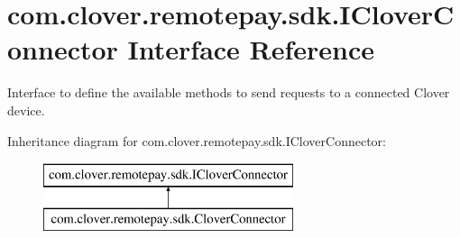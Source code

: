 \hypertarget{interfacecom_1_1clover_1_1remotepay_1_1sdk_1_1_i_clover_connector}{}\section{com.\+clover.\+remotepay.\+sdk.\+I\+Clover\+Connector Interface Reference}
\label{interfacecom_1_1clover_1_1remotepay_1_1sdk_1_1_i_clover_connector}


Interface to define the available methods to send requests to a connected Clover device.  


Inheritance diagram for com.\+clover.\+remotepay.\+sdk.\+I\+Clover\+Connector\+:\begin{figure}[H]
\begin{center}
\leavevmode
\includegraphics[height=2.000000cm]{interfacecom_1_1clover_1_1remotepay_1_1sdk_1_1_i_clover_connector}
\end{center}
\end{figure}
